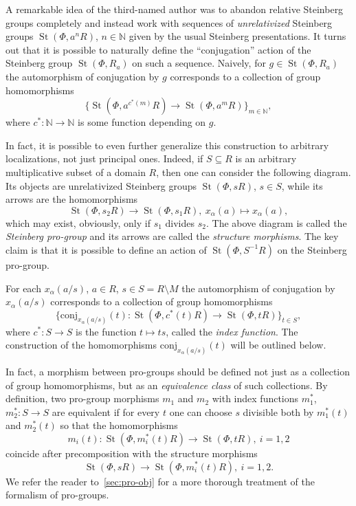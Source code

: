 \documentclass[oneside, 11pt]{amsart}
\numberwithin{equation}{section}
\theoremstyle{definition}
\theoremstyle{remark}
\DeclareMathOperator\St{St}
\begin{document}
A remarkable idea of the third-named author was to abandon relative Steinberg groups completely and instead work with sequences of {\it unrelativized} Steinberg groups $\St(\Phi, a^nR)$, $n \in \mathbb N$ given by the usual Steinberg presentations.
It turns out that it is possible to naturally define the ``conjugation'' action of the Steinberg group $\St(\Phi, R_a)$ on such a sequence. Naively, for $g \in \St(\Phi, R_a)$ the automorphism of conjugation by $g$ corresponds to a collection of group homomorphisms \[\{\St(\Phi, a^{c^*(m)}R) \to \St(\Phi, a^{m}R)\}_{m \in \mathbb N },\] where $c^*\colon \mathbb N \to \mathbb N$ is some function depending on $g$.

In fact, it is possible to even further generalize this construction to arbitrary localizations, not just principal ones.
Indeed, if $S \subseteq R$ is an arbitrary multiplicative subset of a domain $R$, then one can consider the following diagram.
Its objects are unrelativized Steinberg groups $\St(\Phi, sR)$, $s \in S$, while its arrows are the homomorphisms
\[ \St(\Phi, s_2R) \to \St(\Phi, s_1R),\ x_\alpha(a) \mapsto x_\alpha(a), \]
which may exist, obviously, only if $s_1$ divides $s_2$. 
The above diagram is called the {\it Steinberg pro-group} and its arrows are called the {\it structure morphisms}. 
The key claim is that it is possible to define an action of $\St(\Phi, S^{-1}R)$ on the Steinberg pro-group. 

For each $x_{\alpha}(a/s)$, $a\in R$, $s\in S = R\setminus M$ the automorphism of conjugation by $x_\alpha(a/s)$ corresponds to a collection of group homomorphisms \begin{equation} \label{eq:collection} \{\mathrm{conj}_{x_\alpha(a/s)}(t) \colon  \St(\Phi, c^*(t)R) \to \St(\Phi, tR)\}_{t \in S},\end{equation} where $c^*\colon S \to S$ is the function $t \mapsto ts$, called the {\it index function}. The construction of the homomorphisms $\mathrm{conj}_{x_\alpha(a/s)}(t)$ will be outlined below.

In fact, a morphism between pro-groups should be defined not just as a collection of group homomorphisms, but as an {\it equivalence class} of such collections. By definition, two pro-group morphisms $m_1$ and $m_2$ with index functions $m_1^*$,$m_2^* \colon S \to S$ are equivalent if for every $t$ one can choose $s$ divisible both by $m_1^*(t)$ and $m_2^*(t)$ so that the homomorphisms \[m_i(t) \colon \St(\Phi, m_i^*(t)R) \to \St(\Phi, tR),\ i=1,2\] coincide after precomposition with the structure morphisms \[\St(\Phi, sR) \to \St(\Phi, m^*_i(t)R),\ i=1,2.\]
We refer the reader to~\cref{sec:pro-obj} for a more thorough treatment of the formalism of pro-groups.
\end{document}
